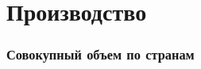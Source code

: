 \section{Производство}

\begin{frame}
    \frametitle{Совокупный объем по странам}
    \begin{center}
    
    \end{center}
\end{frame}